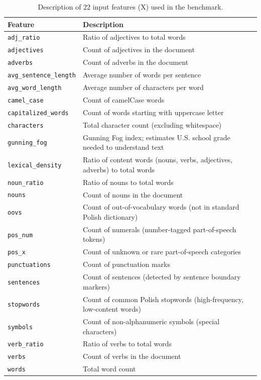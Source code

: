 ﻿\documentclass[11pt]{article}
\begin{document}
\begin{table}[htbp]
\centering
\caption{Description of 22 input features (X) used in the benchmark.}
\label{tab:feature_descriptions}
\small
\begin{tabular}{lp{}}
\toprule
\textbf{Feature} & \textbf{Description} \\
\midrule
\texttt{adj\_ratio} & Ratio of adjectives to total words \\
\texttt{adjectives} & Count of adjectives in the document \\
\texttt{adverbs} & Count of adverbs in the document \\
\texttt{avg\_sentence\_length} & Average number of words per sentence \\
\texttt{avg\_word\_length} & Average number of characters per word \\
\texttt{camel\_case} & Count of camelCase words \\
\texttt{capitalized\_words} & Count of words starting with uppercase letter \\
\texttt{characters} & Total character count (excluding whitespace) \\
\texttt{gunning\_fog} & Gunning Fog index; estimates U.S. school grade needed to understand text \\
\texttt{lexical\_density} & Ratio of content words (nouns, verbs, adjectives, adverbs) to total words \\
\texttt{noun\_ratio} & Ratio of nouns to total words \\
\texttt{nouns} & Count of nouns in the document \\
\texttt{oovs} & Count of out-of-vocabulary words (not in standard Polish dictionary) \\
\texttt{pos\_num} & Count of numerals (number-tagged part-of-speech tokens) \\
\texttt{pos\_x} & Count of unknown or rare part-of-speech categories \\
\texttt{punctuations} & Count of punctuation marks \\
\texttt{sentences} & Count of sentences (detected by sentence boundary markers) \\
\texttt{stopwords} & Count of common Polish stopwords (high-frequency, low-content words) \\
\texttt{symbols} & Count of non-alphanumeric symbols (special characters) \\
\texttt{verb\_ratio} & Ratio of verbs to total words \\
\texttt{verbs} & Count of verbs in the document \\
\texttt{words} & Total word count \\
\bottomrule
\end{tabular}
\end{table}
\end{document}
